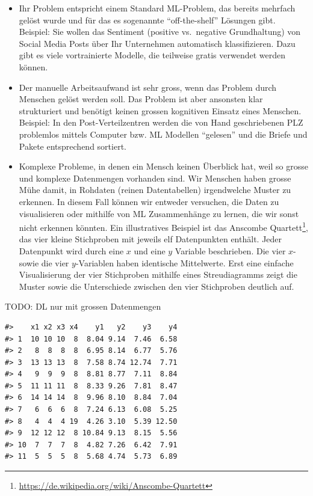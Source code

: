 \documentclass[
]{book}
\providecommand{\tightlist}{%
  \setlength{\itemsep}{0pt}\setlength{\parskip}{0pt}}
\begin{document}
\begin{itemize}
\tightlist
\item
  Ihr Problem entspricht einem Standard ML-Problem, das bereits mehrfach gelöst wurde und für das es sogenannte ``off-the-shelf'' Lösungen gibt. Beispiel: Sie wollen das Sentiment (positive vs.~negative Grundhaltung) von Social Media Posts über Ihr Unternehmen automatisch klassifizieren. Dazu gibt es viele vortrainierte Modelle, die teilweise gratis verwendet werden können.
\item
  Der manuelle Arbeitsaufwand ist sehr gross, wenn das Problem durch Menschen gelöst werden soll. Das Problem ist aber ansonsten klar strukturiert und benötigt keinen grossen kognitiven Einsatz eines Menschen. Beispiel: In den Post-Verteilzentren werden die von Hand geschriebenen PLZ problemlos mittels Computer bzw. ML Modellen ``gelesen'' und die Briefe und Pakete entsprechend sortiert.
\item
  Komplexe Probleme, in denen ein Mensch keinen Überblick hat, weil so grosse und komplexe Datenmengen vorhanden sind. Wir Menschen haben grosse Mühe damit, in Rohdaten (reinen Datentabellen) irgendwelche Muster zu erkennen. In diesem Fall können wir entweder versuchen, die Daten zu visualisieren oder mithilfe von ML Zusammenhänge zu lernen, die wir sonst nicht erkennen könnten. Ein illustratives Beispiel ist das Anscombe Quartett\footnote{\url{https://de.wikipedia.org/wiki/Anscombe-Quartett}}, das vier kleine Stichproben mit jeweils elf Datenpunkten enthält. Jeder Datenpunkt wird durch eine \(x\) und eine \(y\) Variable beschrieben. Die vier \(x\)- sowie die vier \(y\)-Variablen haben identische Mittelwerte. Erst eine einfache Visualisierung der vier Stichproben mithilfe eines Streudiagramms zeigt die Muster sowie die Unterschiede zwischen den vier Stichproben deutlich auf.
\end{itemize}

TODO: DL nur mit grossen Datenmengen

\begin{verbatim}
#>    x1 x2 x3 x4    y1   y2    y3    y4
#> 1  10 10 10  8  8.04 9.14  7.46  6.58
#> 2   8  8  8  8  6.95 8.14  6.77  5.76
#> 3  13 13 13  8  7.58 8.74 12.74  7.71
#> 4   9  9  9  8  8.81 8.77  7.11  8.84
#> 5  11 11 11  8  8.33 9.26  7.81  8.47
#> 6  14 14 14  8  9.96 8.10  8.84  7.04
#> 7   6  6  6  8  7.24 6.13  6.08  5.25
#> 8   4  4  4 19  4.26 3.10  5.39 12.50
#> 9  12 12 12  8 10.84 9.13  8.15  5.56
#> 10  7  7  7  8  4.82 7.26  6.42  7.91
#> 11  5  5  5  8  5.68 4.74  5.73  6.89
\end{verbatim}
\end{document}
